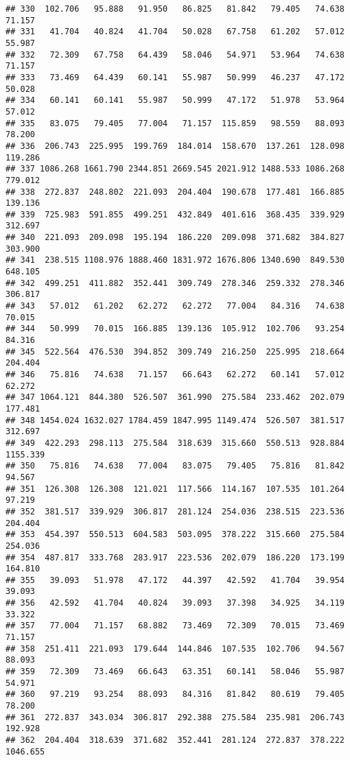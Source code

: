 \documentclass[
]{article}
\begin{document}
\begin{verbatim}
## 330  102.706   95.888   91.950   86.825   81.842   79.405   74.638   71.157
## 331   41.704   40.824   41.704   50.028   67.758   61.202   57.012   55.987
## 332   72.309   67.758   64.439   58.046   54.971   53.964   74.638   71.157
## 333   73.469   64.439   60.141   55.987   50.999   46.237   47.172   50.028
## 334   60.141   60.141   55.987   50.999   47.172   51.978   53.964   57.012
## 335   83.075   79.405   77.004   71.157  115.859   98.559   88.093   78.200
## 336  206.743  225.995  199.769  184.014  158.670  137.261  128.098  119.286
## 337 1086.268 1661.790 2344.851 2669.545 2021.912 1488.533 1086.268  779.012
## 338  272.837  248.802  221.093  204.404  190.678  177.481  166.885  139.136
## 339  725.983  591.855  499.251  432.849  401.616  368.435  339.929  312.697
## 340  221.093  209.098  195.194  186.220  209.098  371.682  384.827  303.900
## 341  238.515 1108.976 1888.460 1831.972 1676.806 1340.690  849.530  648.105
## 342  499.251  411.882  352.441  309.749  278.346  259.332  278.346  306.817
## 343   57.012   61.202   62.272   62.272   77.004   84.316   74.638   70.015
## 344   50.999   70.015  166.885  139.136  105.912  102.706   93.254   84.316
## 345  522.564  476.530  394.852  309.749  216.250  225.995  218.664  204.404
## 346   75.816   74.638   71.157   66.643   62.272   60.141   57.012   62.272
## 347 1064.121  844.380  526.507  361.990  275.584  233.462  202.079  177.481
## 348 1454.024 1632.027 1784.459 1847.995 1149.474  526.507  381.517  312.697
## 349  422.293  298.113  275.584  318.639  315.660  550.513  928.884 1155.339
## 350   75.816   74.638   77.004   83.075   79.405   75.816   81.842   94.567
## 351  126.308  126.308  121.021  117.566  114.167  107.535  101.264   97.219
## 352  381.517  339.929  306.817  281.124  254.036  238.515  223.536  204.404
## 353  454.397  550.513  604.583  503.095  378.222  315.660  275.584  254.036
## 354  487.817  333.768  283.917  223.536  202.079  186.220  173.199  164.810
## 355   39.093   51.978   47.172   44.397   42.592   41.704   39.954   39.093
## 356   42.592   41.704   40.824   39.093   37.398   34.925   34.119   33.322
## 357   77.004   71.157   68.882   73.469   72.309   70.015   73.469   71.157
## 358  251.411  221.093  179.644  144.846  107.535  102.706   94.567   88.093
## 359   72.309   73.469   66.643   63.351   60.141   58.046   55.987   54.971
## 360   97.219   93.254   88.093   84.316   81.842   80.619   79.405   78.200
## 361  272.837  343.034  306.817  292.388  275.584  235.981  206.743  192.928
## 362  204.404  318.639  371.682  352.441  281.124  272.837  378.222 1046.655

\end{verbatim}
\end{document}
